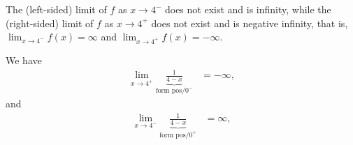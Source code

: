 \documentclass[nooutcomes]{ximera}
\renewenvironment{freeResponse}{
\ifhandout\setbox0\vbox\bgroup\else
\begin{trivlist}\item[\hskip \labelsep\bfseries Solution:\hspace{2ex}]
\fi}
{\ifhandout\egroup\else
\end{trivlist}
\fi}
\begin{document}
\begin{problem}
\begin{itemize}
    \item[(d)]
      The (left-sided) limit of $f$ as $x \to 4^-$ does not exist and is infinity, while the (right-sided) limit of $f$ as $x \to 4^+$ does not exist and is negative infinity, that is, $\lim_{x \to 4^-} f(x) = \infty$ and $\lim_{x \to 4^+} f(x) = -\infty$.
      \begin{freeResponse}
        We have
        \begin{align*}
          \lim_{x \to 4^+} \underbrace{\frac{1}{4-x}}_\text{form $\text{pos}/0^-$} &= -\infty,
        \end{align*}
        and
        \begin{align*}
          \lim_{x \to 4^-} \underbrace{\frac{1}{4-x}}_\text{form $\text{pos}/0^+$} &= \infty,
        \end{align*}
      \end{freeResponse}
  \end{itemize}
\end{problem}
\end{document}
